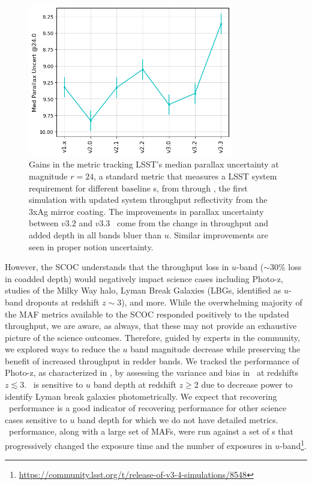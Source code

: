 \begin{figure}
    \centering

\includegraphics[width=0.8\textwidth]{figures/parallax.png}
\caption{Gains in the metric tracking LSST's median parallax uncertainty at magnitude $r=24$, a standard metric that measures a LSST  system requirement for different $\mathrm{baseline}$ \opsim s, from  through , the first simulation with updated system throughput  reflectivity from the 3xAg mirror coating. The improvements in parallax uncertainty between $v3.2$ and $v3.3$ \opsim\ come from the change in throughput and added depth in all bands bluer than $u$. Similar improvements are seen in proper notion uncertainty.}
\label{fig:parallax}
\end{figure}

However, the SCOC understands that the throughput loss in $u$-band ($\sim30\%$  loss in coadded depth) would negatively impact science cases including Photo-z, studies of the Milky Way halo, Lyman Break Galaxies (LBGs, identified as $u$-band dropouts at redshift $z\sim3$), and more. While the overwhelming majority of the MAF metrics available to the SCOC responded positively to the updated throughput, we are aware, as always, that these may not provide an exhaustive picture of the science outcomes. Therefore, guided by experts in the community, we explored ways to reduce the $u$ band magnitude decrease while preserving the benefit of increased throughput in redder bands. 
We tracked the performance of Photo-z, as characterized in \citealt{Graham_2017}, by assessing the variance and bias in \pz\ at redshifts $z\lesssim{3}$. \pz\ is sensitive to $u$ band depth at redshift $z\geq 2$ due to decrease power to identify Lyman break galaxies photometrically. We expect that recovering \pz\ performance is a good indicator of recovering performance for other science cases sensitive to $u$ band depth for which we do not have detailed metrics. \pz\ performance, along with a large set of MAFs, were run against a set of \opsim s  that progressively changed the exposure time and the number of exposures in $u$-band\footnote{\url{https://community.lsst.org/t/release-of-v3-4-simulations/8548}}. 

